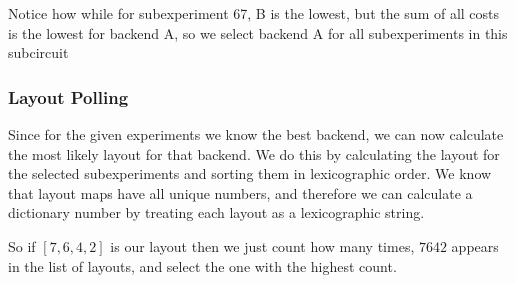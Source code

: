 \documentclass[hidelinks]{book}
\numberwithin{equation}{section}
\begin{document}
Notice how while for subexperiment 67, B is the lowest, but the sum of all costs is the lowest for backend A, so we select backend A for all subexperiments in this subcircuit

\subsubsection{Layout Polling}\label{layout-polling}
Since for the given experiments we know the best backend, we can now calculate the most likely layout for that backend. We do this by calculating the layout for the selected subexperiments and sorting them in lexicographic order. We know that layout maps have all unique numbers, and therefore we can calculate a dictionary number by treating each layout as a lexicographic string.

So if $[7, 6, 4, 2]$ is our layout then we just count how many times, $7642$ appears in the list of layouts, and select the one with the highest count.
\end{document}
